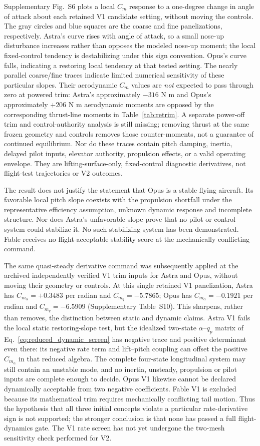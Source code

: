 \documentclass[10pt,letterpaper]{article}
\begin{document}
Supplementary Fig.~S6 plots a local $C_m$ response to a one-degree change in angle of attack about each retained V1 candidate setting, without moving the controls. The gray circles and blue squares are the coarse and fine panelizations, respectively. Astra's curve rises with angle of attack, so a small nose-up disturbance increases rather than opposes the modeled nose-up moment; the local fixed-control tendency is destabilizing under this sign convention. Opus's curve falls, indicating a restoring local tendency at that tested setting. The nearly parallel coarse/fine traces indicate limited numerical sensitivity of these particular slopes. Their aerodynamic $C_m$ values are \emph{not} expected to pass through zero at powered trim: Astra's approximately $-316$ N m and Opus's approximately $+206$ N m aerodynamic moments are opposed by the corresponding thrust-line moments in Table~\ref{tab:retrim}. A separate power-off trim and control-authority analysis is still missing; removing thrust at the same frozen geometry and controls removes those counter-moments, not a guarantee of continued equilibrium. Nor do these traces contain pitch damping, inertia, delayed pilot inputs, elevator authority, propulsion effects, or a valid operating envelope. They are lifting-surface-only, fixed-control diagnostic derivatives, not flight-test trajectories or V2 outcomes.

The result does not justify the statement that Opus is a stable flying aircraft. Its favorable local pitch slope coexists with the propulsion shortfall under the representative efficiency assumption, unknown dynamic response and incomplete structure. Nor does Astra's unfavorable slope prove that no pilot or control system could stabilize it. No such stabilizing system has been demonstrated. Fable receives no flight-acceptable stability score at the mechanically conflicting command.

The same quasi-steady derivative command was subsequently applied at the archived independently verified V1 trim inputs for Astra and Opus, without moving their geometry or controls. At this single retained V1 panelization, Astra has $C_{m_\alpha}=+0.3483$ per radian and $C_{m_q}=-5.7865$; Opus has $C_{m_\alpha}=-0.1921$ per radian and $C_{m_q}=-6.5909$ (Supplementary Table~S10). This sharpens, rather than removes, the distinction between static and dynamic claims. Astra V1 fails the local static restoring-slope test, but the idealized two-state $\alpha$--$q_p$ matrix of Eq.~\ref{eq:reduced_dynamic_screen} has negative trace and positive determinant even there: its negative rate term and lift--pitch coupling can offset the positive $C_{m_\alpha}$ in that reduced algebra. The complete four-state longitudinal system may still contain an unstable mode, and no inertia, unsteady, propulsion or pilot inputs are complete enough to decide. Opus V1 likewise cannot be declared dynamically acceptable from two negative coefficients. Fable V1 is excluded because its mathematical trim requires mechanically conflicting tail motion. Thus the hypothesis that all three initial concepts violate a particular rate-derivative sign is not supported; the stronger conclusion is that none has passed a full flight-dynamics gate. The V1 rate screen has not yet undergone the two-mesh sensitivity check performed for V2.
\end{document}
